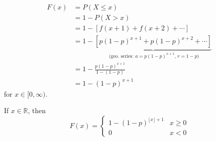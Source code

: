 \begin{align*}
    F(x) & =P(X\le x)                                         \\
         & =1-P(X>x)                                          \\
         & =1-\left[f(x+1)+f(x+2)+\cdots\right]                                  \\
         & =1-\underbrace{\left[p(1-p)^{x+1}+p(1-p)^{x+2}+\cdots\right]}_
    \text{ (geo. series: $a=p(1-p)^{x+1}$, $r=1-p$)}          \\
         & =1-\frac{p(1-p)^{x+1}}{1-(1-p)}                    \\
         & =1-(1-p)^{x+1}
\end{align*}
for $ x\in[0,\infty) $.

If $ x\in\mathbb{R} $, then
\[ F(x)=
    \left\{\begin{array}{cc}
        1-(1-p)^{\lfloor x \rfloor +1}& x\ge 0 \\
        0& x < 0
    \end{array}\right.
\]